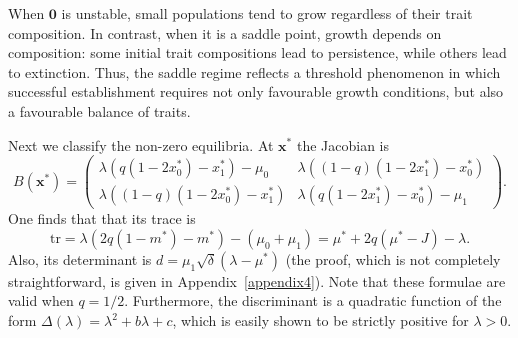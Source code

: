 \documentclass[12pt]{article}
\newcommand{\tr}{\text{tr}}
\newcommand{\bzero}{\boldsymbol{0}}
\newcommand{\bx}{\boldsymbol{x}}
\begin{document}
When $\bzero$ is unstable, small populations tend to grow regardless of
their trait composition. In contrast, when it is a saddle point, growth
depends on composition: some initial trait compositions lead to
persistence, while others lead to extinction. Thus, the saddle regime
reflects a threshold phenomenon in which successful establishment
requires not only favourable growth conditions, but also a favourable
balance of traits.

Next we classify the non-zero equilibria. At $\bx^*$ the Jacobian is
$$
B(\bx^*)=
\left(
\begin{matrix}
\lambda(q(1-2x_0^*)-x_1^*)-\mu_0 & \lambda ((1-q)(1-2x_1^*)-x_0^*) \\
\lambda((1-q)(1-2x_0^*)-x_1^*) & \lambda(q(1-2x_1^*)-x_0^*)-\mu_1  
\end{matrix}
\right).
$$
One finds that that its trace is
$$
\tr 
= \lambda(2q(1-m^*) -m^*) - (\mu_0+\mu_1)
= \mu^* + 2q(\mu^*- J) - \lambda.
$$
Also, its determinant is $d=\mu_1\sqrt{\delta}(\lambda-\mu^*)$ (the
proof, which is not completely straightforward, is given in
Appendix~\ref{appendix4}). Note that these formulae are valid when
$q=1/2$. Furthermore, the discriminant is a quadratic function of the
form $\Delta(\lambda)=\lambda^2 + b\lambda + c$, which is easily shown to
be strictly positive for $\lambda>0$.
%
\end{document}
